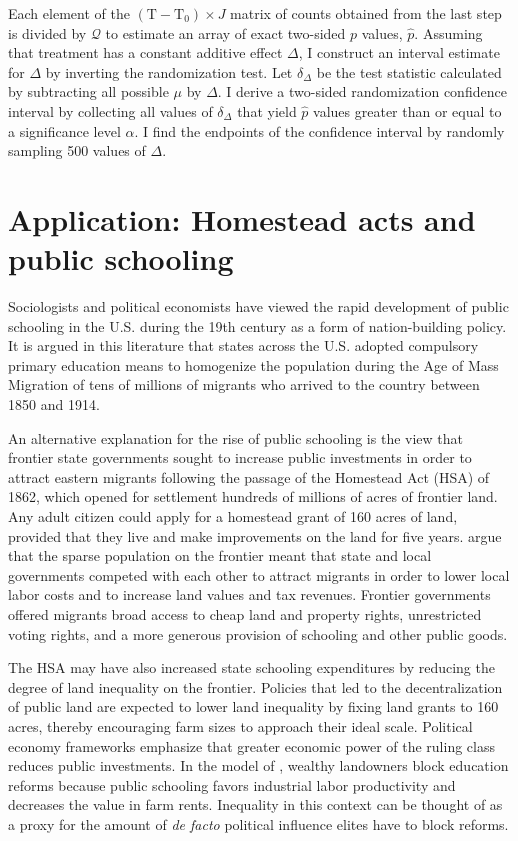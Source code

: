 \documentclass[hidelinks,12pt]{article}
\begin{document}
Each element of the $(\text{T}-\text{T}_0) \times J$ matrix of counts obtained from the last step is divided by $\mathcal{Q}$ to estimate an array of exact two-sided $p$ values, $\hat{p}$. Assuming that treatment has a constant additive effect $\Delta$, I construct an interval estimate for $\Delta$ by inverting the randomization test. Let $\delta_\Delta$ be the test statistic calculated by subtracting all possible $\mu$ by $\Delta$. I derive a two-sided randomization confidence interval by collecting all values of $\delta_\Delta$ that yield $\hat{p}$ values greater than or equal to a significance level $\alpha$. I find the endpoints of the confidence interval by randomly sampling 500 values of $\Delta$.


\section{Application: Homestead acts and public schooling} \label{schooling-app}

Sociologists and political economists \citep[e.g,][]{meyer1979public,alesina2013nation,bandiera2018nation} have viewed the rapid development of public schooling in the U.S. during the 19th century as a form of nation-building policy. It is argued in this literature that states across the U.S. adopted compulsory primary education means to homogenize the population during the Age of Mass Migration of tens of millions of migrants who arrived to the country between 1850 and 1914. 

An alternative explanation for the rise of public schooling is the view that frontier state governments sought to increase public investments in order to attract eastern migrants following the passage of the Homestead Act (HSA) of 1862, which opened for settlement hundreds of millions of acres of frontier land.  Any adult citizen could apply for a homestead grant of 160 acres of land, provided that they live and make improvements on the land for five years. \citet{engerman2005evolution} argue that the sparse population on the frontier meant that state and local governments competed with each other to attract migrants in order to lower local labor costs and to increase land values and tax revenues. Frontier governments offered migrants broad access to cheap land and property rights, unrestricted voting rights, and a more generous provision of schooling and other public goods.

The HSA may have also increased state schooling expenditures by reducing the degree of land inequality on the frontier. Policies that led to the decentralization of public land are expected to lower land inequality by fixing land grants to 160 acres, thereby encouraging farm sizes to approach their ideal scale. Political economy frameworks \citep[e.g.,][]{acemoglu2008persistence, besley2009origins} emphasize that greater economic power of the ruling class reduces public investments. In the model of \citet{galor2009inequality}, wealthy landowners block education reforms because public schooling favors industrial labor productivity and decreases the value in farm rents. Inequality in this context can be thought of as a proxy for the amount of \emph{de facto} political influence elites have to block reforms.
\end{document}
